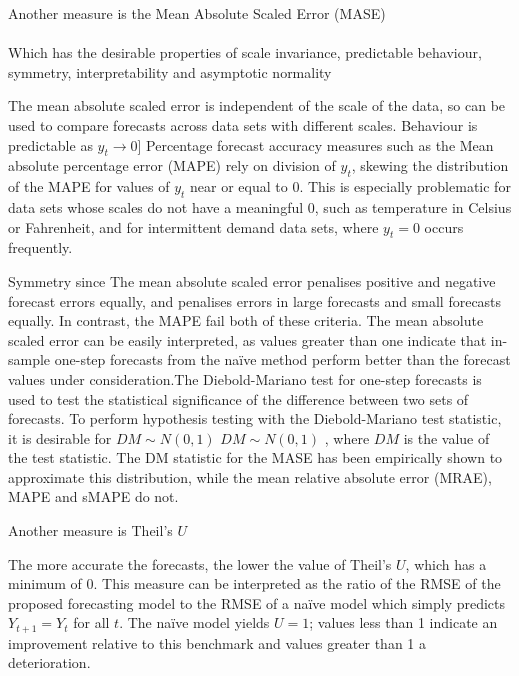 Another measure is the Mean Absolute Scaled Error (MASE) \\

 \\

Which has the desirable properties of scale invariance, predictable behaviour, symmetry, interpretability and asymptotic normality
 
The mean absolute scaled error is independent of the scale of the data, so can be used to compare forecasts across data sets with different scales. Behaviour is predictable as $y_{t}\rightarrow 0$] Percentage forecast accuracy measures such as the Mean absolute percentage error (MAPE) rely on division of $y_{t}$, skewing the distribution of the MAPE for values of $y_{t}$ near or equal to 0. This is especially problematic for data sets whose scales do not have a meaningful 0, such as temperature in Celsius or Fahrenheit, and for intermittent demand data sets, where $y_{t}=0$  occurs frequently.

Symmetry since The mean absolute scaled error penalises positive and negative forecast errors equally, and penalises errors in large forecasts and small forecasts equally. In contrast, the MAPE  fail both of these criteria. The mean absolute scaled error can be easily interpreted, as values greater than one indicate that in-sample one-step forecasts from the naïve method perform better than the forecast values under consideration.The Diebold-Mariano test for one-step forecasts is used to test the statistical significance of the difference between two sets of forecasts. To perform hypothesis testing with the Diebold-Mariano test statistic, it is desirable for $DM ∼ N ( 0 , 1 )$ $DM\sim N(0,1)$ , where $DM$ is the value of the test statistic. The DM statistic for the MASE has been empirically shown to approximate this distribution, while the mean relative absolute error (MRAE), MAPE and sMAPE do not.
 
Another measure is Theil's $U$\\
  

The more accurate the forecasts, the lower the value of Theil's $U$,   which has a minimum of 0. This measure can be interpreted as the ratio of the RMSE of the proposed forecasting model to the RMSE of  a na\"ive model which simply predicts $Y_{t+1} = Y_t$ for all $t$. The na\"ive model yields $U = 1$; values less than 1 indicate an  improvement relative to this benchmark and values greater than 1 a deterioration.

